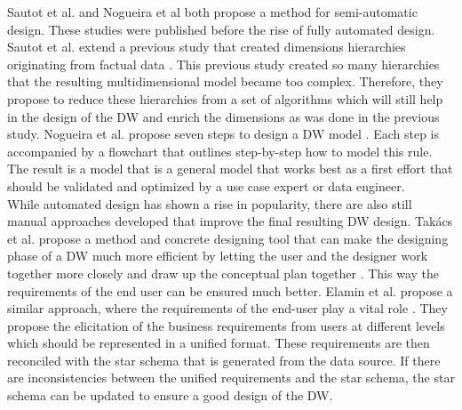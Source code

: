 \documentclass[11pt]{article}
\begin{document}
Sautot et al. and Nogueira et al both propose a method for semi-automatic design. These studies were published before the rise of fully automated design. Sautot et al. extend a previous study that created dimensions hierarchies originating from factual data \cite{Sautot202128}. This previous study created so many hierarchies that the resulting multidimensional model became too complex. Therefore, they propose to reduce these hierarchies from a set of algorithms which will still help in the design of the DW and enrich the dimensions as was done in the previous study. Nogueira et al. propose seven steps to design a DW model \cite{Nogueira202085}. Each step is accompanied by a flowchart that outlines step-by-step how to model this rule. The result is a model that is a general model that works best as a first effort that should be validated and optimized by a use case expert or data engineer. \\

While automated design has shown a rise in popularity, there are also still manual approaches developed that improve the final resulting DW design. Takács et al. propose a method and concrete designing tool that can make the designing phase of a DW much more efficient by letting the user and the designer work together more closely and draw up the conceptual plan together \cite{Takács20201}. This way the requirements of the end user can be ensured much better. Elamin et al. propose a similar approach, where the requirements of the end-user play a vital role \cite{Elamin2019}. They propose the elicitation of the business requirements from users at different levels which should be represented in a unified format. These requirements are then reconciled with the star schema that is generated from the data source. If there are inconsistencies between the unified requirements and the star schema, the star schema can be updated to ensure a good design of the DW. \\
\end{document}
